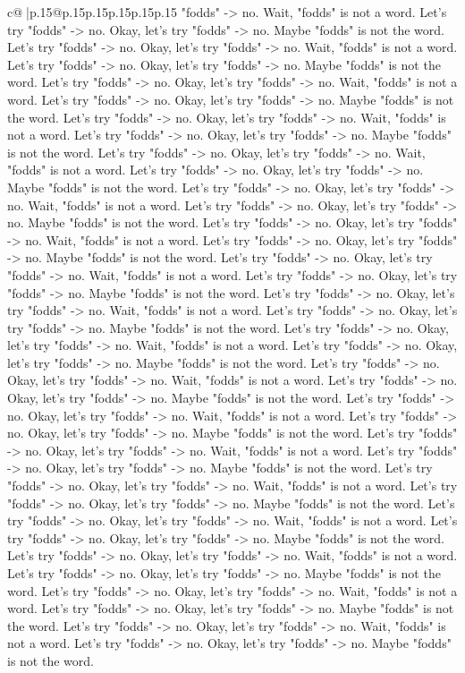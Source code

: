 \documentclass{article}
\begin{document}
{\begin{supertabular}{c@{$\;$}|p{.15\linewidth}@{}p{.15\linewidth}p{.15\linewidth}p{.15\linewidth}p{.15\linewidth}p{.15\linewidth}}
{{{"fodds" {-}> no. Wait, "fodds" is not a word. Let's try "fodds" {-}> no. Okay, let's try "fodds" {-}> no. Maybe "fodds" is not the word. Let's try "fodds" {-}> no. Okay, let's try "fodds" {-}> no. Wait, "fodds" is not a word. Let's try "fodds" {-}> no. Okay, let's try "fodds" {-}> no. Maybe "fodds" is not the word. Let's try "fodds" {-}> no. Okay, let's try "fodds" {-}> no. Wait, "fodds" is not a word. Let's try "fodds" {-}> no. Okay, let's try "fodds" {-}> no. Maybe "fodds" is not the word. Let's try "fodds" {-}> no. Okay, let's try "fodds" {-}> no. Wait, "fodds" is not a word. Let's try "fodds" {-}> no. Okay, let's try "fodds" {-}> no. Maybe "fodds" is not the word. Let's try "fodds" {-}> no. Okay, let's try "fodds" {-}> no. Wait, "fodds" is not a word. Let's try "fodds" {-}> no. Okay, let's try "fodds" {-}> no. Maybe "fodds" is not the word. Let's try "fodds" {-}> no. Okay, let's try "fodds" {-}> no. Wait, "fodds" is not a word. Let's try "fodds" {-}> no. Okay, let's try "fodds" {-}> no. Maybe "fodds" is not the word. Let's try "fodds" {-}> no. Okay, let's try "fodds" {-}> no. Wait, "fodds" is not a word. Let's try "fodds" {-}> no. Okay, let's try "fodds" {-}> no. Maybe "fodds" is not the word. Let's try "fodds" {-}> no. Okay, let's try "fodds" {-}> no. Wait, "fodds" is not a word. Let's try "fodds" {-}> no. Okay, let's try "fodds" {-}> no. Maybe "fodds" is not the word. Let's try "fodds" {-}> no. Okay, let's try "fodds" {-}> no. Wait, "fodds" is not a word. Let's try "fodds" {-}> no. Okay, let's try "fodds" {-}> no. Maybe "fodds" is not the word. Let's try "fodds" {-}> no. Okay, let's try "fodds" {-}> no. Wait, "fodds" is not a word. Let's try "fodds" {-}> no. Okay, let's try "fodds" {-}> no. Maybe "fodds" is not the word. Let's try "fodds" {-}> no. Okay, let's try "fodds" {-}> no. Wait, "fodds" is not a word. Let's try "fodds" {-}> no. Okay, let's try "fodds" {-}> no. Maybe "fodds" is not the word. Let's try "fodds" {-}> no. Okay, let's try "fodds" {-}> no. Wait, "fodds" is not a word. Let's try "fodds" {-}> no. Okay, let's try "fodds" {-}> no. Maybe "fodds" is not the word. Let's try "fodds" {-}> no. Okay, let's try "fodds" {-}> no. Wait, "fodds" is not a word. Let's try "fodds" {-}> no. Okay, let's try "fodds" {-}> no. Maybe "fodds" is not the word. Let's try "fodds" {-}> no. Okay, let's try "fodds" {-}> no. Wait, "fodds" is not a word. Let's try "fodds" {-}> no. Okay, let's try "fodds" {-}> no. Maybe "fodds" is not the word. Let's try "fodds" {-}> no. Okay, let's try "fodds" {-}> no. Wait, "fodds" is not a word. Let's try "fodds" {-}> no. Okay, let's try "fodds" {-}> no. Maybe "fodds" is not the word. Let's try "fodds" {-}> no. Okay, let's try "fodds" {-}> no. Wait, "fodds" is not a word. Let's try "fodds" {-}> no. Okay, let's try "fodds" {-}> no. Maybe "fodds" is not the word. Let's try "fodds" {-}> no. Okay, let's try "fodds" {-}> no. Wait, "fodds" is not a word. Let's try "fodds" {-}> no. Okay, let's try "fodds" {-}> no. Maybe "fodds" is not the word. Let's try "fodds" {-}> no. Okay, let's try "fodds" {-}> no. Wait, "fodds" is not a word. Let's try "fodds" {-}> no. Okay, let's try "fodds" {-}> no. Maybe "fodds" is not the word. }}}
\end{supertabular}}
\end{document}

